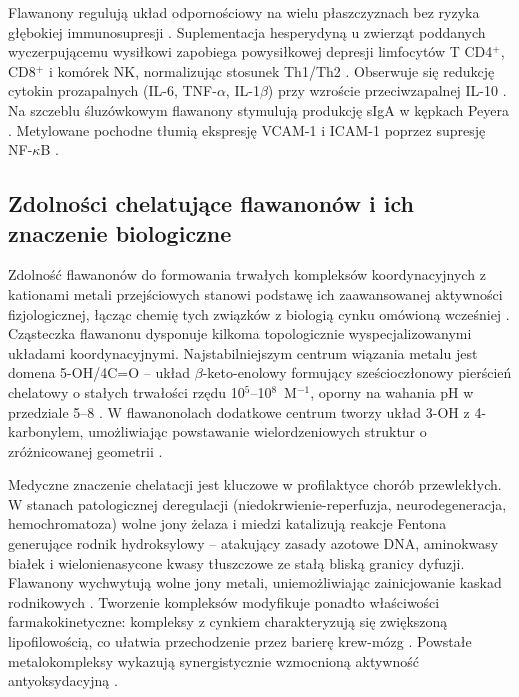 \documentclass[12pt,a4paper]{article}
\begin{document}
Flawanony regulują układ odpornościowy na wielu płaszczyznach bez ryzyka głębokiej immunosupresji \cite{kopustinskiene2020}. Suplementacja hesperydyną u zwierząt poddanych wyczerpującemu wysiłkowi zapobiega powysiłkowej depresji limfocytów T CD4\(^+\), CD8\(^+\) i komórek NK, normalizując stosunek Th1/Th2 \cite{ruiz2020}. Obserwuje się redukcję cytokin prozapalnych (IL-6, TNF-$\alpha$, IL-1$\beta$) przy wzroście przeciwzapalnej IL-10 \cite{ruiz2020}. Na szczeblu śluzówkowym flawanony stymulują produkcję sIgA w kępkach Peyera \cite{camps2017}. Metylowane pochodne tłumią ekspresję VCAM-1 i ICAM-1 poprzez supresję NF-$\kappa$B \cite{klosek2023}.



\subsection{Zdolności chelatujące flawanonów i ich znaczenie biologiczne}

Zdolność flawanonów do formowania trwałych kompleksów koordynacyjnych z kationami metali przejściowych stanowi podstawę ich zaawansowanej aktywności fizjologicznej, łącząc chemię tych związków z biologią cynku omówioną wcześniej \cite{santos2020}. Cząsteczka flawanonu dysponuje kilkoma topologicznie wyspecjalizowanymi układami koordynacyjnymi. Najstabilniejszym centrum wiązania metalu jest domena 5-OH/4C=O -- układ $\beta$-keto-enolowy formujący sześcioczłonowy pierścień chelatowy o stałych trwałości rzędu 10\(^{5}\)--10\(^{8}\)~M\(^{-1}\), oporny na wahania pH w przedziale 5--8 \cite{stipcevic2006, santos2020}. W flawanonolach dodatkowe centrum tworzy układ 3-OH z 4-karbonylem, umożliwiając powstawanie wielordzeniowych struktur o zróżnicowanej geometrii \cite{stipcevic2006}.

Medyczne znaczenie chelatacji jest kluczowe w profilaktyce chorób przewlekłych. W stanach patologicznej deregulacji (niedokrwienie-reperfuzja, neurodegeneracja, hemochromatoza) wolne jony żelaza i miedzi katalizują reakcje Fentona generujące rodnik hydroksylowy -- atakujący zasady azotowe DNA, aminokwasy białek i wielonienasycone kwasy tłuszczowe ze stałą bliską granicy dyfuzji. Flawanony wychwytują wolne jony metali, uniemożliwiając zainicjowanie kaskad rodnikowych \cite{santos2020}. Tworzenie kompleksów modyfikuje ponadto właściwości farmakokinetyczne: kompleksy z cynkiem charakteryzują się zwiększoną lipofilowością, co ułatwia przechodzenie przez barierę krew-mózg \cite{stipcevic2006}. Powstałe metalokompleksy wykazują synergistycznie wzmocnioną aktywność antyoksydacyjną \cite{santos2020}.
\end{document}
